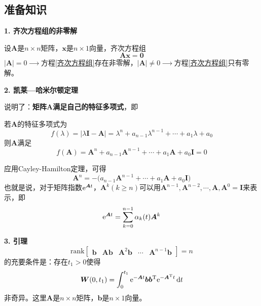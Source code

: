 \subsection{准备知识}
\noindent \textbf{1. 齐次方程组的非零解}

设$\bm{A}$是$n\times n$矩阵，$\bm{x}$是$n \times 1$向量，齐次方程组
\begin{equation}
	\bm{Ax} = \bm{0}
	\label{齐次方程组}
\end{equation}
$|\bm{A}| = 0 \xrightarrow{\quad \quad }$方程\eqref{齐次方程组}存在非零解，$|\bm{A}| \neq 0 \xrightarrow{\quad \quad }$方程\eqref{齐次方程组}只有零解。
\vspace*{1em}

\noindent \textbf{2. 凯莱—哈米尔顿定理}

说明了：\textbf{矩阵$\bm{A}$满足自己的特征多项式}，即

若$\bm{A}$的特征多项式为
\begin{equation}
	f(\lambda) = |\lambda \bm{I} - \bm{A}| = \lambda^n + a_{n-1}\lambda^{n-1} + \cdots + a_1 \lambda + a_0
\end{equation}
则$\bm{A}$满足
\begin{equation}
	f(\bm{A}) = \bm{A}^n + a_{n-1}\bm{A}^{n-1} + \cdots + a_1 \bm{A}+ a_0 \bm{I} = 0
\end{equation}

应用Cayley-Hamilton定理，可得
\begin{equation}
	\bm{A}^n = - \big(a_{n-1}\bm{A}^{n-1} + \cdots + a_1 \bm{A} + a_0 \bm{I}\big)
\end{equation}
也就是说，对于矩阵指数${\rm{e}}^{\bm{A}t}$，$\bm{A}^k(k \ge n)$可以用$\bm{A}^{n-1}, \bm{A}^{n-2}, \cdots, \bm{A}, \bm{A}^0 = \bm{I}$来表示，即
\begin{equation}
	{\rm{e}}^{\bm{A}t} = \sum_{k = 0}^{n - 1}\alpha_k(t)\bm{A}^k
\end{equation}
\vspace*{0.5em}

\noindent \textbf{3. 引理}
\begin{equation}
	\text{rank}
	\begin{bmatrix}
		\bm{b} & \bm{Ab} & \bm{A}^2\bm{b} &\cdots & \bm{A}^{n-1}\bm{b}
	\end{bmatrix}
	= n
\end{equation}
的充要条件是：存在$t_1 > 0$使得
\begin{equation}
	\bm{W}(0,t_1) = \int_0^{t_1}{\rm{e}}^{-\bm{A}t}\bm{b}\bm{b}^{\text{T}}{\rm{e}}^{-\bm{A}^{\text{T}}t}\, {\rm{d}} t
\end{equation}
非奇异。这里$\bm{A}$是$n \times n$矩阵，$\bm{b}$是$n \times 1$向量。
\vspace*{1em}

